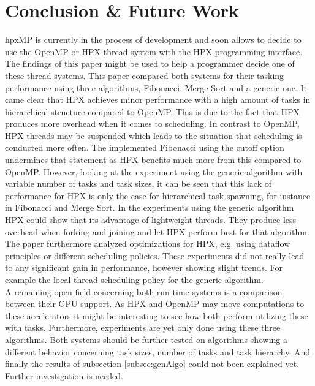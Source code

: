 \section{Conclusion \& Future Work}
hpxMP is currently in the process of development and soon allows to decide to use the OpenMP or HPX thread system with the HPX programming interface.
The findings of this paper might be used to help a programmer decide one of these thread systems.
This paper compared both systems for their tasking performance using three algorithms, Fibonacci, Merge Sort and a generic one.
It came clear that HPX achieves minor performance with a high amount of tasks in hierarchical structure compared to OpenMP.
This is due to the fact that HPX produces more overhead when it comes to scheduling.
In contrast to OpenMP, HPX threads may be suspended which leads to the situation that scheduling is conducted more often.
The implemented Fibonacci using the cutoff option undermines that statement as HPX benefits much more from this compared to OpenMP.
However, looking at the experiment using the generic algorithm with variable number of tasks and task sizes, it can be seen that this lack of performance for HPX is only the case for hierarchical task spawning, for instance in Fibonacci and Merge Sort.
In the experiments using the generic algorithm HPX could show that its advantage of lightweight threads.
They produce less overhead when forking and joining and let HPX perform best for that algorithm.
The paper furthermore analyzed optimizations for HPX, e.g. using dataflow principles or different scheduling policies.
These experiments did not really lead to any significant gain in performance, however showing slight trends.
For example the local thread scheduling policy for the generic algorithm.
\\

A remaining open field concerning both run time systems is a comparison between their GPU support.
As HPX and OpenMP may move computations to these accelerators it might be interesting to see how both perform utilizing these with tasks.
Furthermore, experiments are yet only done using these three algorithms.
Both systems should be further tested on algorithms showing a different behavior concerning task sizes, number of tasks and task hierarchy.
And finally the results of subsection \ref{subsec:genAlgo} could not been explained yet.
Further investigation is needed.
